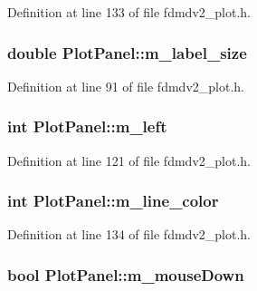 Definition at line 133 of file fdmdv2\-\_\-plot.\-h.

\hypertarget{class_plot_panel_a00eb5aef94866f0f385fcf793cb841b6}{
\subsubsection[{m\-\_\-label\-\_\-size}]{\setlength{\rightskip}{0pt plus 5cm}double Plot\-Panel\-::m\-\_\-label\-\_\-size}}\label{class_plot_panel_a00eb5aef94866f0f385fcf793cb841b6}


Definition at line 91 of file fdmdv2\-\_\-plot.\-h.

\hypertarget{class_plot_panel_ab41676a2e46c2e801bc639c274a7d5f5}{
\subsubsection[{m\-\_\-left}]{\setlength{\rightskip}{0pt plus 5cm}int Plot\-Panel\-::m\-\_\-left\hspace{0.3cm}{\ttfamily [protected]}}}\label{class_plot_panel_ab41676a2e46c2e801bc639c274a7d5f5}


Definition at line 121 of file fdmdv2\-\_\-plot.\-h.

\hypertarget{class_plot_panel_aff281e896bdb1f76d9ccbbe1d15c721d}{
\subsubsection[{m\-\_\-line\-\_\-color}]{\setlength{\rightskip}{0pt plus 5cm}int Plot\-Panel\-::m\-\_\-line\-\_\-color\hspace{0.3cm}{\ttfamily [protected]}}}\label{class_plot_panel_aff281e896bdb1f76d9ccbbe1d15c721d}


Definition at line 134 of file fdmdv2\-\_\-plot.\-h.

\hypertarget{class_plot_panel_acebe9485868374626f03516e3508b592}{
\subsubsection[{m\-\_\-mouse\-Down}]{\setlength{\rightskip}{0pt plus 5cm}bool Plot\-Panel\-::m\-\_\-mouse\-Down\hspace{0.3cm}{\ttfamily [protected]}}}\label{class_plot_panel_acebe9485868374626f03516e3508b592}


